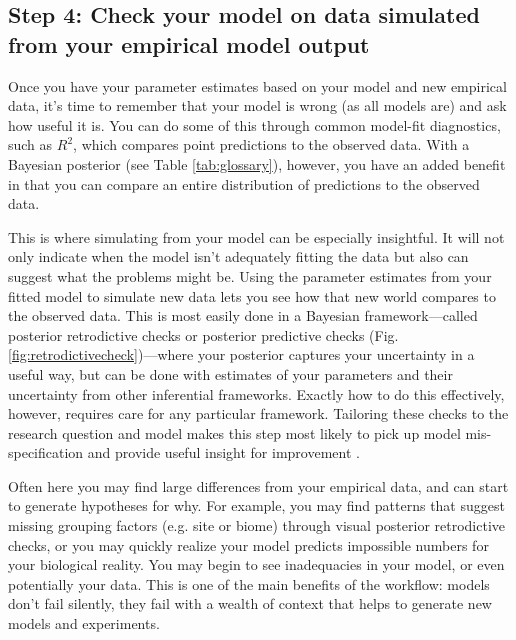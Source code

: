 \documentclass[11pt]{article}
\newcommand{\R}[1]{\label{}\linelabel{#1}}
\begin{document}
\subsection*{Step 4: Check your model on data simulated from your empirical model output} %

Once you have your parameter estimates based on your model and new empirical data, it's time to remember that your model is wrong (as all models are) and ask how useful it is. You can do some of this through common model-fit diagnostics, such as $R^2$, which compares point predictions to the observed data. With a Bayesian posterior (see Table \ref{tab:glossary}), however, you have an added benefit in that you can compare an entire distribution of predictions to the observed data. 

This is where simulating from your model can be especially insightful. It will not only indicate when the model isn't adequately fitting the data but also can suggest what the problems might be. Using the parameter estimates from your fitted model to simulate new data \citep[][]{held2010,gelman200ppc,conn2018} lets you see how that new world compares to the observed data. This is most easily done in a Bayesian framework---called posterior retrodictive checks or posterior predictive checks (Fig. \ref{fig:retrodictivecheck})---where your posterior captures your uncertainty in a useful way, but can be done with estimates of your parameters and their uncertainty from other inferential frameworks. \R{betterppcstart}Exactly how to do this effectively, however, requires care for any particular framework. Tailoring these checks to the research question and model makes this step most likely to pick up model mis-specification and provide useful insight for improvement \citep[e.g.,][]{mimno2015posterior}.\R{betterppcend}

Often here you may find large differences from your empirical data, and can start to generate hypotheses for why. For example, you may find patterns that suggest missing grouping factors (e.g. site or biome) through visual posterior retrodictive checks, or you may quickly realize your model predicts impossible numbers for your biological reality. You may begin to see inadequacies in your model, or even potentially your data.  This is one of the main benefits of the workflow: models don't fail silently, they fail with a wealth of context that helps to generate new models and experiments.
\end{document}
